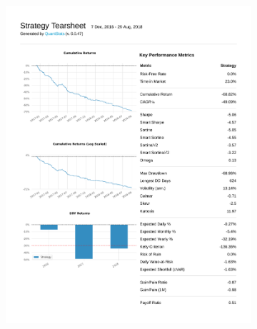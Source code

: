 \documentclass[12pt,a4paper]{article}
\begin{document}
\begin{figure}[ht!]
  \centering
  \begin{subfigure}[ht!]{0.45\textwidth}
    \includegraphics[width=\textwidth]{plots/qs_a2c.pdf}
  \end{subfigure}
  \hspace{0.05\textwidth}
  \begin{subfigure}[ht!]{0.45\textwidth}

\end{subfigure}
\end{figure}
\end{document}
